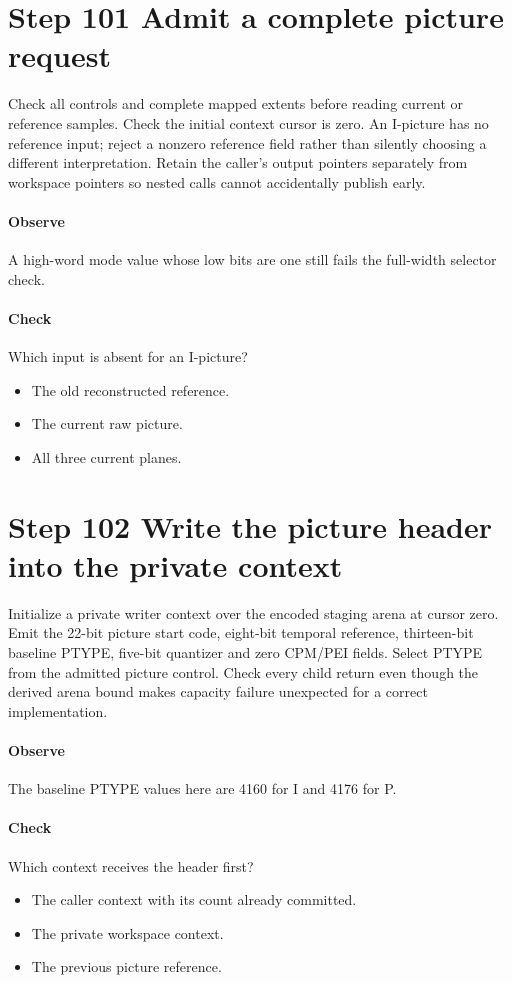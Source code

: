 \section{Step 101 Admit a complete picture request}\label{h263-picture-s01}
Check all controls and complete mapped extents before reading current or reference
samples. Check the initial context cursor is zero. An I-picture has no reference
input; reject a nonzero reference field rather than silently choosing a different
interpretation. Retain the caller's output pointers separately from workspace
pointers so nested calls cannot accidentally publish early.

\paragraph{Observe} A high-word mode value whose low bits are one still fails the full-width selector check.
\paragraph{Check} Which input is absent for an I-picture?
\begin{itemize}
  \item[A.] The old reconstructed reference.
  \item[B.] The current raw picture.
  \item[C.] All three current planes.
\end{itemize}

\section{Step 102 Write the picture header into the private context}\label{h263-picture-s02}
Initialize a private writer context over the encoded staging arena at cursor zero.
Emit the 22-bit picture start code, eight-bit temporal reference, thirteen-bit
baseline PTYPE, five-bit quantizer and zero CPM/PEI fields. Select PTYPE from the
admitted picture control. Check every child return even though the derived arena
bound makes capacity failure unexpected for a correct implementation.

\paragraph{Observe} The baseline PTYPE values here are 4160 for I and 4176 for P.
\paragraph{Check} Which context receives the header first?
\begin{itemize}
  \item[A.] The caller context with its count already committed.
  \item[B.] The private workspace context.
  \item[C.] The previous picture reference.
\end{itemize}


